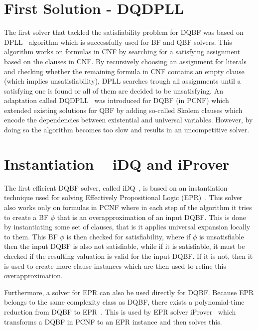 \documentclass[
  digital, %
  twoside, %
  table,   %
  nolof,     %
  nolot,     %
]{fithesis3}
\theoremstyle{definition}
\theoremstyle{remark}
\begin{document}

\section{First Solution - DQDPLL}
The first solver that tackled the satisfiability problem for DQBF was based on DPLL~\cite{DPLL} algorithm which is successfully used for BF and QBF solvers. This algorithm works on formulas in CNF by searching for a satisfying assignment based on the clauses in CNF. By recursively choosing an assignment for literals and checking whether the remaining formula in CNF contains an empty clause (which implies unsatisfiability), DPLL searches trough all assignments until a satisfying one is found or all of them are decided to be unsatisfying. An adaptation called DQDPLL~\cite{DPLLalgorithm} was introduced for DQBF (in PCNF) which extended existing solutions for QBF by adding so-called Skolem clauses which encode the dependencies between existential and universal variables. However, by doing so the algorithm becomes too slow and results in an uncompetitive solver.

\section{Instantiation -- iDQ and iProver}
The first efficient DQBF solver, called iDQ~\cite{iDQandDQDIMACS}, is based on an instantiation technique used for solving Effectively Propositional Logic (EPR)~\cite{iProver}. This solver also works only on formulas in PCNF where in each step of the algorithm it tries to create a BF $\phi$ that is an overapproximation of an input DQBF. This is done by instantiating some set of clauses, that is it applies universal expansion locally to them. This BF $\phi$ is then checked for satisfiability, where if $\phi$ is unsatisfiable then the input DQBF is also not satisfiable, while if it is satisfiable, it must be checked if the resulting valuation is valid for the input DQBF. If it is not, then it is used to create more clause instances which are then used to refine this overapproximation.

Furthermore, a solver for EPR can also be used directly for DQBF. Because EPR belongs to the same complexity class as DQBF, there exists a polynomial-time reduction from DQBF to EPR~\cite{iDQandDQDIMACS}. This is used by EPR solver iProver~\cite{iProver} which transforms a DQBF in PCNF to an EPR instance and then solves this. %
\end{document}

